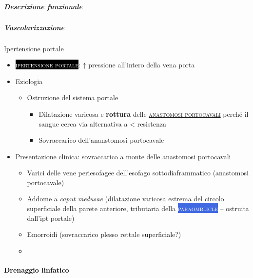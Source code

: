 \documentclass[italian,]{article}
\providecommand{\tightlist}{%
  \setlength{\itemsep}{0pt}\setlength{\parskip}{0pt}}
\newcommand{\ven}[1]{\colorbox{RoyalBlue}{\textcolor{white}{\textsc{#1}}}}
\newcommand{\pat}[1]{\colorbox{black}{\textcolor{white}{\textsc{#1}}}}
\renewcommand{\a}[1]{\underline{\textsc{#1}}}
\begin{document}
\hypertarget{descrizione-funzionale}{%
\subparagraph{Descrizione funzionale}\label{descrizione-funzionale}}

\hypertarget{vascolarizzazione-6}{%
\subparagraph{Vascolarizzazione}\label{vascolarizzazione-6}}

Ipertensione portale

\begin{itemize}
\item
  \pat{ipertensione portale}: ↑ pressione all'intero della vena porta
\item
  Eziologia

  \begin{itemize}
  \tightlist
  \item
    Ostruzione del sistema portale

    \begin{itemize}
    \tightlist
    \item
      Dilatazione varicosa e \textbf{rottura} delle
      \a{anastomosi portocavali} perché il sangue cerca via alternativa
      a \textless{} resistenza
    \item
      Sovraccarico dell'ananstomosi portocavale
    \end{itemize}
  \end{itemize}
\item
  Presentazione clinica: sovraccarico a monte delle anastomosi
  portocavali

  \begin{itemize}
  \item
    Varici delle vene periesofagee dell'esofago sottodiaframmatico
    (anastomosi portocavale)
  \item
    Addome a \emph{caput medusae} (dilatazione varicosa estrema del
    circolo superficiale della parete anteriore, tributaria della
    \ven{paraomblicle} -- ostruita dall'ipt portale)
  \item
    Emorroidi (sovraccarico plesso rettale superficiale?)
  \item
  \end{itemize}
\end{itemize}

\hypertarget{drenaggio-linfatico-2}{%
\paragraph{Drenaggio linfatico}\label{drenaggio-linfatico-2}}
\end{document}
